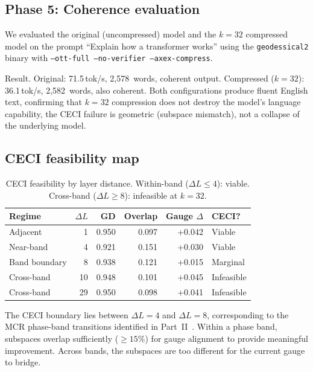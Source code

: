 \documentclass[11pt]{article}
\begin{document}
\subsection{Phase 5: Coherence evaluation}

We evaluated the original (uncompressed) model and the $k{=}32$
compressed model on the prompt ``Explain how a transformer works''
using the \texttt{geodessical2} binary with
\texttt{--ott-full --no-verifier --axex-compress}.

Result. Original: 71.5\,tok/s, 2,578~words, coherent output.
Compressed ($k{=}32$): 36.1\,tok/s, 2,582~words, also coherent. Both
configurations produce fluent English text, confirming that $k{=}32$
compression does not destroy the model's language capability, the
CECI failure is geometric (subspace mismatch), not a collapse of the
underlying model.

\subsection{CECI feasibility map}

\begin{table}[h]\centering\small
\caption{CECI feasibility by layer distance. Within-band
($\Delta L{\le}4$): viable. Cross-band ($\Delta L{\ge}8$):
infeasible at $k{=}32$.}
\label{tab:ceci-feasibility}
\begin{tabular}{@{}lrrrrl@{}}
\toprule
Regime & $\Delta L$ & GD & Overlap & Gauge $\Delta$ & CECI? \\
\midrule
Adjacent & 1 & 0.950 & 0.097 & +0.042 & Viable \\
Near-band & 4 & 0.921 & 0.151 & +0.030 & Viable \\
Band boundary & 8 & 0.938 & 0.121 & +0.015 & Marginal \\
Cross-band & 10 & 0.948 & 0.101 & +0.045 & Infeasible \\
Cross-band & 29 & 0.950 & 0.098 & +0.041 & Infeasible \\
\bottomrule
\end{tabular}
\end{table}

The CECI boundary lies between $\Delta L{=}4$ and $\Delta L{=}8$,
corresponding to the MCR phase-band transitions identified in
Part~II~\cite{stewart2026gp}. Within a phase band, subspaces overlap
sufficiently (${\ge}15\%$) for gauge alignment to provide meaningful
improvement. Across bands, the subspaces are too different for the
current gauge to bridge.
\end{document}
